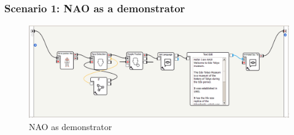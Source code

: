 \documentclass{llncs}
\begin{document}
\subsubsection{Scenario 1: NAO as a demonstrator}%
\begin{figure}
\centering
\includegraphics[width=\textwidth]{../thesis/assets/scenario_museum_choregraphe.png}
\caption[NAO as demonstrator]{NAO as demonstrator}
\label{fig:scenario1_program_choregraphe}
\end{figure}
\end{document}
